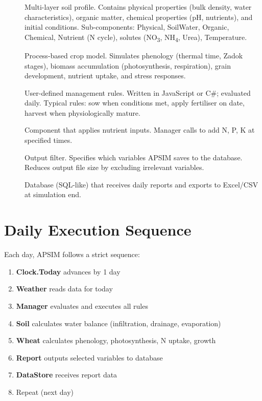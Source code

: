 \begin{description}
  \item[] Multi-layer soil profile. Contains physical properties (bulk density, water characteristics), organic matter, chemical properties (pH, nutrients), and initial conditions. Sub-components: Physical, SoilWater, Organic, Chemical, Nutrient (N cycle), solutes (NO\textsubscript{3}, NH\textsubscript{4}, Urea), Temperature.
  
  \item[] Process-based crop model. Simulates phenology (thermal time, Zadok stages), biomass accumulation (photosynthesis, respiration), grain development, nutrient uptake, and stress responses.
  
  \item[] User-defined management rules. Written in JavaScript or C\#; evaluated daily. Typical rules: sow when conditions met, apply fertiliser on date, harvest when physiologically mature.
  
  \item[] Component that applies nutrient inputs. Manager calls  to add N, P, K at specified times.
  
  \item[] Output filter. Specifies which variables APSIM saves to the database. Reduces output file size by excluding irrelevant variables.
  
  \item[] Database (SQL-like) that receives daily reports and exports to Excel/CSV at simulation end.
\end{description}

\section{Daily Execution Sequence}

Each day, APSIM follows a strict sequence:

\begin{enumerate}
  \item \textbf{Clock.Today} advances by 1 day
  \item \textbf{Weather} reads data for today
  \item \textbf{Manager} evaluates and executes all rules
  \item \textbf{Soil} calculates water balance (infiltration, drainage, evaporation)
  \item \textbf{Wheat} calculates phenology, photosynthesis, N uptake, growth
  \item \textbf{Report} outputs selected variables to database
  \item \textbf{DataStore} receives report data
  \item Repeat (next day)
\end{enumerate}

